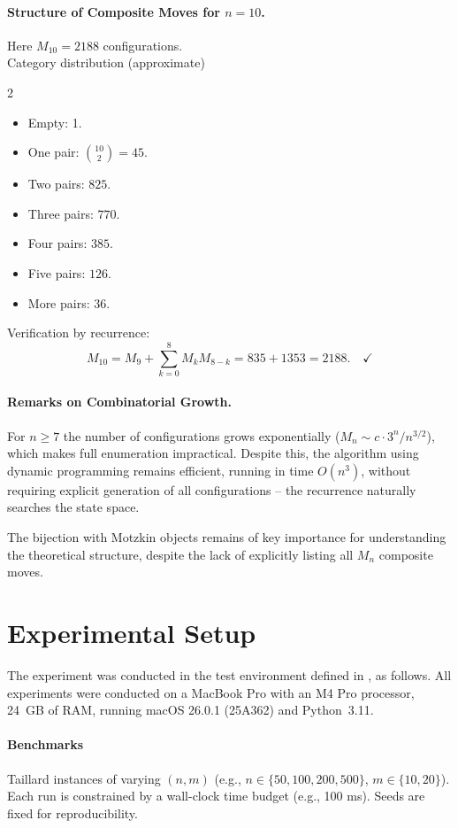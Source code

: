 \documentclass[runningheads]{llncs}
\begin{document}
\paragraph{Structure of Composite Moves for $n=10$.} Here $M_{10} = 2188$ configurations.
\\
Category distribution (approximate)
\begin{multicols}{2}
\begin{itemize}
  \item Empty: 1.
  \item One pair: $\binom{10}{2} = 45$.
  \item Two pairs: $ 825$.
  \item Three pairs: $ 770$.
  \item Four pairs: $ 385$.
  \item Five pairs: $ 126$.
  \item More pairs: $ 36$.
\end{itemize}
\end{multicols}
Verification by recurrence:
\begin{equation}
M_{10} = M_9 + \sum_{k=0}^{8} M_k M_{8-k} = 835 + 1353 = 2188. \quad \checkmark 
\end{equation}

\paragraph{Remarks on Combinatorial Growth.}
For $n \ge 7$ the number of configurations grows exponentially ($M_n \sim c \cdot 3^n / n^{3/2}$), which makes full enumeration impractical. Despite this, the algorithm using dynamic programming remains efficient, running in time $O(n^3)$, without requiring explicit generation of all configurations -- the recurrence naturally searches the state space.

The bijection with Motzkin objects remains of key importance for understanding the theoretical structure, despite the lack of explicitly listing all $M_n$ composite moves.


\section{Experimental Setup}
The experiment was conducted in the test environment defined in \cite{WojewodzkiBozejko2026}, as follows. All experiments were conducted on a MacBook Pro with an M4 Pro processor, 24~GB of RAM, running macOS 26.0.1 (25A362) and Python~3.11.

\paragraph{Benchmarks}
Taillard instances \cite{ref_taillard} of varying $(n,m)$ (e.g., $n\in\{50,100,200,500\}$, $m\in\{10,20\}$). Each run is constrained by a wall-clock time budget (e.g., 100 ms). Seeds are fixed for reproducibility.
\end{document}
